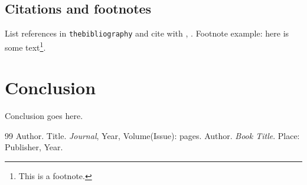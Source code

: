 \documentclass{article}
\begin{document}
\subsection{Citations and footnotes}
List references in \texttt{thebibliography} and cite with \cite{ref1}, \cite{ref2}. Footnote example: here is some text\footnote{This is a footnote.}.

\section{Conclusion}
Conclusion goes here.

\begin{thebibliography}{99}
 Author. Title. \textit{Journal}, Year, Volume(Issue): pages.
 Author. \textit{Book Title}. Place: Publisher, Year.
\end{thebibliography}
\end{document}
